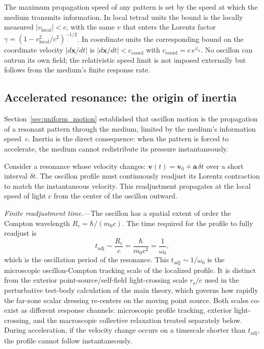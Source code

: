 \documentclass[aps,prd,onecolumn,superscriptaddress,nofootinbib,showpacs,12pt,notitlepage]{revtex4-2}
\newcommand{\rs}{r_{\mathrm{s}}}
\begin{document}
The maximum propagation speed of any pattern is set by
the speed at which the medium transmits information.
In local tetrad units the bound is the locally measured
$|v_{\mathrm{local}}| < c$, with the same $v$ that
enters the Lorentz factor $\gamma = (1 -
v_{\mathrm{local}}^2/c^2)^{-1/2}$.  In coordinate units
the corresponding bound on the coordinate velocity
$|d\mathbf{x}/dt|$ is
$|d\mathbf{x}/dt| < c_{\mathrm{coord}}$ with
$c_{\mathrm{coord}} = c\,e^{\varphi_{0}}$.  No oscillon
can outrun its own field; the relativistic speed limit
is not imposed externally but follows from the medium's
finite response rate.

\subsection{Accelerated resonance: the origin of inertia}
\label{sec:inertia_mechanism}

Section~\ref{sec:uniform_motion} established that
oscillon motion is the propagation of a resonant pattern
through the medium, limited by the medium's information
speed~$c$.  Inertia is the direct consequence: when the
pattern is forced to accelerate, the medium cannot
redistribute its pressure instantaneously.

Consider a resonance whose velocity changes:
$\mathbf{v}(t) = \mathbf{v}_0 + \mathbf{a}\,\delta t$
over a short interval $\delta t$.  The oscillon profile
must continuously readjust its Lorentz contraction to
match the instantaneous velocity.  This readjustment
propagates at the local speed of light $c$ from the
center of the oscillon outward.

\textit{Finite readjustment time.}---The oscillon has
a spatial extent of order the Compton wavelength
$R_c = \hbar/(m_0 c)$.  The time required for the
profile to fully readjust is
\begin{equation}\label{eq:t_readjust}
  t_{\mathrm{adj}} \sim \frac{R_c}{c}
  = \frac{\hbar}{m_0 c^2}
  = \frac{1}{\omega_0},
\end{equation}
which is the oscillation period of the resonance.
This $t_{\mathrm{adj}}\sim 1/\omega_0$ is the microscopic
oscillon-Compton tracking scale of the localized profile.  It is
distinct from the exterior point-source/self-field light-crossing
scale $\rs/c$ used in the perturbative test-body calculation of
the main theory, which governs how rapidly the far-zone scalar
dressing re-centers on the moving point source.  Both scales
co-exist as different response channels: microscopic profile
tracking, exterior light-crossing, and the macroscopic collective
relaxation treated separately below.
During acceleration, if the velocity change occurs
on a timescale shorter than $t_{\mathrm{adj}}$, the
profile cannot follow instantaneously.
\end{document}
